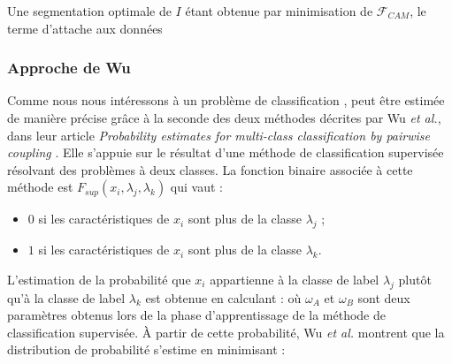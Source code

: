 Une segmentation optimale  de $I$ étant obtenue par minimisation de $\mathcal{F}_{CAM}$, le terme d'attache aux données   

\subsubsection{Approche de Wu}
Comme nous nous intéressons à un problème de classification ,  peut être estimée de manière précise grâce à la seconde des deux méthodes décrites par Wu \textit{et al.}, dans leur article \emph{\og Probability estimates for multi-class classification by pairwise coupling \fg} \cite{wu2004probability}. Elle s'appuie sur le résultat d'une méthode de classification supervisée résolvant des problèmes à deux classes. La fonction binaire associée à cette méthode est $F_{sup}(x_{i},\lambda_{j},\lambda_{k})$ qui vaut :
\begin{itemize}
\item $0$ si les caractéristiques de $x_{i}$ sont plus   de la classe $\lambda_{j}$ ;
\item $1$ si les caractéristiques de $x_{i}$ sont plus    de la classe $\lambda_{k}$.
\end{itemize}
L'estimation de la  probabilité que $x_{i}$ appartienne à la classe de label $\lambda_{j}$ plutôt qu'à la classe de label $\lambda_{k}$ est obtenue en calculant :
où $\omega_{A}$ et $\omega_{B}$ sont deux paramètres obtenus lors de la phase d'apprentissage de la méthode de classification supervisée. À partir de cette probabilité, Wu \textit{et al.} montrent que la distribution de probabilité  s'estime en minimisant :

